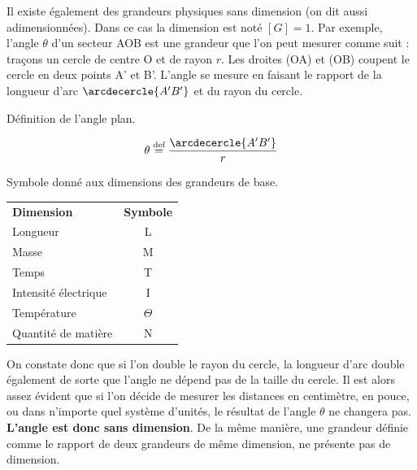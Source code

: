 Il existe également des grandeurs physiques sans dimension (on dit aussi adimensionnées). Dans ce cas la dimension est noté $[G]=1$. Par exemple, l'angle $\theta$ d'un secteur AOB est une grandeur que l'on peut mesurer comme suit : traçons un cercle de centre O et de rayon  $r$. Les droites (OA) et (OB) coupent le cercle en deux points A' et B'. L'angle se mesure en faisant le rapport de la longueur d'arc $\arcdecercle{A'B'}$ et du rayon du cercle.
\begin{marginfigure}
\centering
\caption{Définition de l'angle plan.}
\end{marginfigure}
\[
	\theta\stackrel{\text{def}}= \dfrac{\arcdecercle{A'B'}}{r}
\]
\begin{margintable}
\centering
\footnotesize
\caption{Symbole donné aux dimensions des grandeurs de base.}
	\begin{tabular}{lc}
		\toprule
		\textbf{Dimension}		& \textbf{Symbole}	\\
		Longueur				& L			\\
		Masse					& M			\\
		Temps					& T			\\
		Intensité électrique	& I			\\
		Température				& $\Theta$	\\	
		Quantité de matière		& N\\
		\bottomrule
	\end{tabular}
\end{margintable}
On constate donc que si l'on double le rayon du cercle, la longueur d'arc double également de sorte que l'angle ne dépend pas de la taille du cercle. Il est alors assez évident que si l'on décide de mesurer les distances en centimètre, en pouce, ou dans n'importe quel système d'unités, le résultat de l'angle $\theta$ ne changera pas. \textbf{L'angle est donc sans dimension}. De la même manière, une grandeur définie comme le rapport de deux grandeurs de même dimension, ne présente pas de dimension. 

